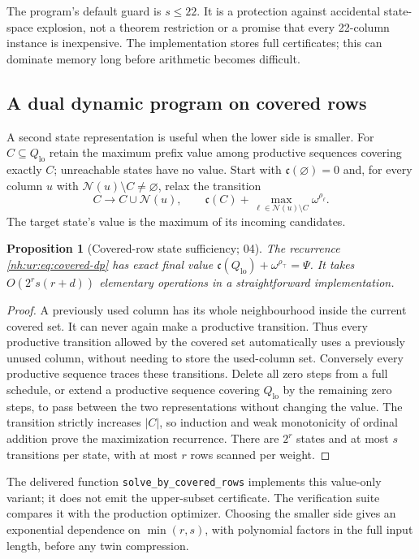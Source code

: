 \documentclass[11pt,a4paper]{article}
\newtheorem{proposition}[theorem]{Proposition}
\theoremstyle{definition}
\theoremstyle{remark}
\newcommand{\Qlo}{Q_{\mathrm{lo}}}
\newcommand{\Nb}{\mathcal N}
\newcommand{\rtop}{\rho_{\top}}
\begin{document}
The program's default guard is $s\le22$. It is a protection against
accidental state-space explosion, not a theorem restriction or a promise that
every 22-column instance is inexpensive. The implementation stores full
certificates; this can dominate memory long before arithmetic becomes
difficult.

\subsection{A dual dynamic program on covered rows}
A second state representation is useful when the lower side is smaller. For
$C\subseteq\Qlo$ retain the maximum prefix value among productive sequences
covering exactly $C$; unreachable states have no value. Start with
$\mathfrak c(\varnothing)=0$ and, for every column $u$ with
$\Nb(u)\setminus C\ne\varnothing$, relax the transition
\begin{equation}\label{nh:ur:eq:covered-dp}
 C\longrightarrow C\cup\Nb(u),\qquad
 \mathfrak c(C)+\max_{\ell\in\Nb(u)\setminus C}\omega^{\rho_\ell}.
\end{equation}
The target state's value is the maximum of its incoming candidates.

\begin{proposition}[Covered-row state sufficiency; 04]\label{nh:ur:prop:covered}
The recurrence \eqref{nh:ur:eq:covered-dp} has exact final value
$\mathfrak c(\Qlo)+\omega^{\rtop}=\Psi$. It takes $O(2^r s(r+d))$ elementary
operations in a straightforward implementation.
\end{proposition}
\begin{proof}
A previously used column has its whole neighbourhood inside the current
covered set. It can never again make a productive transition. Thus every
productive transition allowed by the covered set automatically uses a
previously unused column, without needing to store the used-column set.
Conversely every productive sequence traces these transitions. Delete all
zero steps from a full schedule, or extend a productive sequence covering
$\Qlo$ by the remaining zero steps, to pass between the two representations
without changing the value. The transition strictly increases $|C|$, so
induction and weak monotonicity of ordinal addition prove the maximization
recurrence. There are $2^r$ states and at most $s$ transitions per state,
with at most $r$ rows scanned per weight.
\end{proof}
The delivered function \texttt{solve\_by\_covered\_rows} implements this
value-only variant; it does not emit the upper-subset certificate. The
verification suite compares it with the production optimizer. Choosing the
smaller side gives an exponential dependence on $\min(r,s)$, with polynomial
factors in the full input length, before any twin compression.
\end{document}
